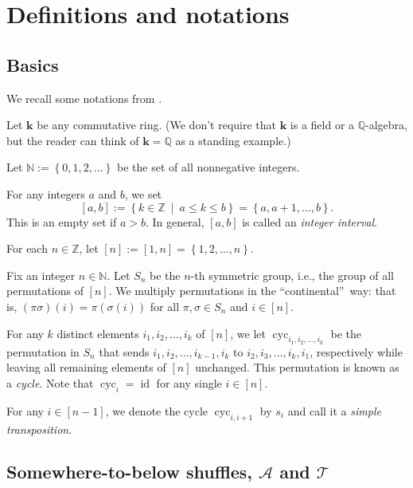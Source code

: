 \documentclass[numbers=enddot,12pt,final,onecolumn,notitlepage]{scrartcl}%
\theoremstyle{definition}
\begin{document}
\section{Definitions and notations}

\subsection{Basics}

We recall some notations from \cite{s2b1}.

Let $\mathbf{k}$ be any commutative ring. (We don't require that $\mathbf{k}$
is a field or a $\mathbb{Q}$-algebra, but the reader can think of
$\mathbf{k}=\mathbb{Q}$ as a standing example.)

Let $\mathbb{N}:=\left\{  0,1,2,\ldots\right\}  $ be the set of all
nonnegative integers.

For any integers $a$ and $b$, we set
\[
\left[  a,b\right]  :=\left\{  k\in\mathbb{Z}\ \mid\ a\leq k\leq b\right\}
=\left\{  a,a+1,\ldots,b\right\}  .
\]
This is an empty set if $a>b$. In general, $\left[  a,b\right]  $ is called an
\emph{integer interval}.

For each $n\in\mathbb{Z}$, let $\left[  n\right]  :=\left[  1,n\right]
=\left\{  1,2,\ldots,n\right\}  $.

Fix an integer $n\in\mathbb{N}$. Let $S_{n}$ be the $n$-th symmetric group,
i.e., the group of all permutations of $\left[  n\right]  $. We multiply
permutations in the \textquotedblleft continental\textquotedblright\ way: that
is, $\left(  \pi\sigma\right)  \left(  i\right)  =\pi\left(  \sigma\left(
i\right)  \right)  $ for all $\pi,\sigma\in S_{n}$ and $i\in\left[  n\right]
$.

For any $k$ distinct elements $i_{1},i_{2},\ldots,i_{k}$ of $\left[  n\right]
$, we let $\operatorname*{cyc}\nolimits_{i_{1},i_{2},\ldots,i_{k}}$ be the
permutation in $S_{n}$ that sends $i_{1},i_{2},\ldots,i_{k-1},i_{k}$ to
$i_{2},i_{3},\ldots,i_{k},i_{1}$, respectively while leaving all remaining
elements of $\left[  n\right]  $ unchanged. This permutation is known as a
\emph{cycle}. Note that $\operatorname*{cyc}\nolimits_{i}=\operatorname*{id}$
for any single $i\in\left[  n\right]  $.

For any $i\in\left[  n-1\right]  $, we denote the cycle $\operatorname*{cyc}%
\nolimits_{i,i+1}$ by $s_{i}$ and call it a \emph{simple transposition}.

\subsection{Somewhere-to-below shuffles, $\mathcal{A}$ and $\mathcal{T}$}
\end{document}
